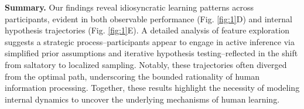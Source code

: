 \textbf{Summary.} Our findings reveal idiosyncratic learning patterns across participants, evident in both observable performance (Fig. \ref{fig:1}D) and internal hypothesis trajectories (Fig. \ref{fig:1}E). A detailed analysis of feature exploration suggests a strategic process--participants appear to engage in active inference via simplified prior assumptions and iterative hypothesis testing--reflected in the shift from saltatory to localized sampling. Notably, these trajectories often diverged from the optimal path, underscoring the bounded rationality of human information processing. Together, these results highlight the necessity of modeling internal dynamics to uncover the underlying mechanisms of human learning. 
